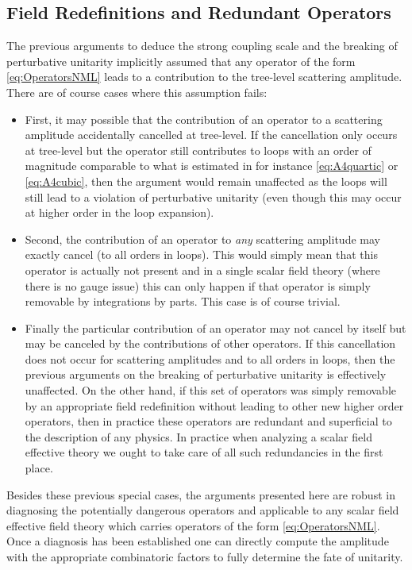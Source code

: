 \documentclass[12pt]{article}
\begin{document}
\subsection{Field Redefinitions and Redundant Operators}
\label{sub:fieldRedef}

The previous arguments to deduce the strong coupling scale and the breaking of perturbative unitarity implicitly assumed that any operator of the form \eqref{eq:OperatorsNML} leads to a contribution to the tree-level scattering amplitude. There are of course cases where this assumption fails:
\begin{itemize}

\item First, it may possible that the contribution of an operator to a scattering amplitude accidentally cancelled at tree-level. If the cancellation only occurs at tree-level but the operator still contributes to loops with an order of magnitude comparable to what is estimated in for instance \eqref{eq:A4quartic} or \eqref{eq:A4cubic}, then the argument would remain unaffected as the loops will still lead to a violation of perturbative unitarity (even though this may occur at higher order in the loop expansion).

\item Second, the contribution of an operator to {\it any} scattering amplitude may exactly cancel (to all orders in loops). This would simply mean that this operator is actually not present and in a single scalar field theory (where there is no gauge issue) this can only happen if that operator is simply removable by integrations by parts.  This case is of course trivial.

\item Finally the particular contribution of an operator may not cancel by itself but may be canceled by the contributions of other operators. If this cancellation does not occur for scattering amplitudes and to all orders in loops, then the previous arguments on the breaking of perturbative unitarity is effectively unaffected. On the other hand, if this set of operators was simply removable by an appropriate field redefinition without leading to other new higher order operators, then in practice these operators are redundant and superficial to the description of any physics. In practice when analyzing a scalar field effective theory we ought to take care of all such redundancies in the first place.
\end{itemize}
Besides these previous special cases, the arguments presented here  are robust in diagnosing the potentially dangerous operators  and applicable to any scalar field effective field theory which carries operators of the form \eqref{eq:OperatorsNML}. Once a diagnosis has been established one can directly compute the amplitude with the appropriate combinatoric factors to fully determine the fate of unitarity. \\
\end{document}
